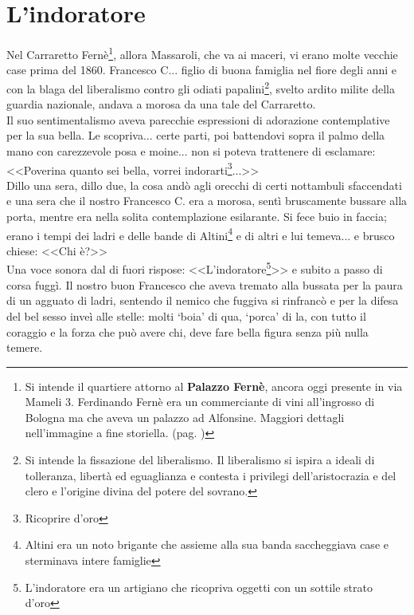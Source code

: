 
\chapter{L'indoratore}
Nel Carraretto Fernè\footnote{Si intende il quartiere attorno al \textbf{Palazzo Fernè}, ancora oggi presente in via Mameli 3. Ferdinando Fernè era un commerciante di vini all'ingrosso di Bologna ma che aveva un palazzo ad Alfonsine. Maggiori dettagli nell'immagine a fine storiella. (pag. \pageref{fig:villamassaroli})}, allora Massaroli, che va ai maceri, vi erano molte vecchie case prima del 1860. Francesco C... figlio di buona famiglia nel fiore degli anni e con la blaga del liberalismo contro gli odiati papalini\footnote{Si intende la fissazione del liberalismo. Il liberalismo si ispira a ideali di tolleranza, libertà ed eguaglianza e contesta i privilegi dell'aristocrazia e del clero e l'origine divina del potere del sovrano.}, svelto ardito milite della guardia nazionale, andava a morosa da una tale del Carraretto. \\
Il suo sentimentalismo aveva parecchie espressioni di adorazione contemplative per la sua bella.
Le scopriva... certe parti, poi battendovi sopra il palmo della mano con carezzevole posa e moine... non si poteva trattenere di esclamare:\\
\indent <<Poverina quanto sei bella, vorrei indorarti\footnote{Ricoprire d'oro}...>>\\
Dillo una sera, dillo due, la cosa andò agli orecchi di certi nottambuli sfaccendati e una sera che il nostro Francesco C. era a morosa, sentì bruscamente bussare alla porta, mentre era nella solita contemplazione esilarante.
Si fece buio in faccia; erano i tempi dei ladri e delle bande di Altini\footnote{Altini era un noto brigante che assieme alla sua banda saccheggiava case e sterminava intere famiglie} e di altri e lui temeva... e brusco chiese: <<Chi è?>>\\
Una voce sonora dal di fuori rispose: <<L'indoratore\footnote{L'indoratore era un artigiano che ricopriva oggetti con un sottile strato d'oro}>> e subito a passo di corsa fuggì.
Il nostro buon Francesco che aveva tremato alla bussata per la paura di un agguato di ladri, sentendo il nemico che fuggiva si rinfrancò e per la difesa del bel sesso inveì alle stelle: molti ‘boia' di qua, ‘porca' di la, con tutto il coraggio e la forza che può avere chi, deve fare bella figura senza più nulla temere.


